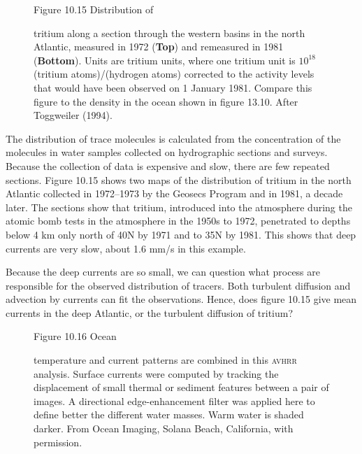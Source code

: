 \begin{figure}[t!]
\footnotesize
Figure 10.15 Distribution of \rule{0pt}{3ex} tritium along a section through the western basins in the north Atlantic, measured in 1972 (\textbf{Top}) and remeasured in 1981 (\textbf{Bottom}). Units are tritium units, where one tritium unit is $10^{18}$ (tritium atoms)/(hydrogen atoms) corrected to the activity levels that would have been observed on 1 January 1981. Compare this figure to the density in the ocean shown in figure 13.10. After Toggweiler (1994).
\label{fig:tritium}
\vspace{-5ex}
\end{figure}

The distribution of trace molecules is calculated from the concentration of the
molecules in water samples collected on hydrographic sections and
surveys. Because the collection of data is expensive and slow, there are few repeated
sections. Figure 10.15 shows two maps of the distribution of tritium in the north Atlantic
collected in 1972--1973 by the Geosecs Program and in 1981, a decade later. The sections show
that tritium, introduced into the atmosphere during the atomic bomb tests in the atmosphere in
the 1950s to 1972, penetrated to depths below 4 km only north of 40\degrees N by 1971 and to
35\degrees N by 1981. This shows that deep currents are very slow, about 1.6 mm/s in this
example.

Because the deep currents are so small, we can question what process are responsible
for the observed distribution of tracers. Both turbulent diffusion and advection by
currents can fit the observations. Hence, does figure 10.15 give mean currents in
the deep Atlantic, or the turbulent diffusion of tritium?

\begin{figure}[t!]
\footnotesize
Figure 10.16 Ocean \rule{0mm}{4ex}temperature and current patterns
are combined in this \textsc{avhrr} analysis. Surface currents were computed by tracking the displacement of small thermal
or sediment features between a pair of images. A directional edge-enhancement filter was
applied here to define better the different water masses. Warm water is shaded darker. From
Ocean Imaging, Solana Beach, California, with permission.
\label{Fig10.16.bw}
\vspace{-4ex}
\end{figure}

